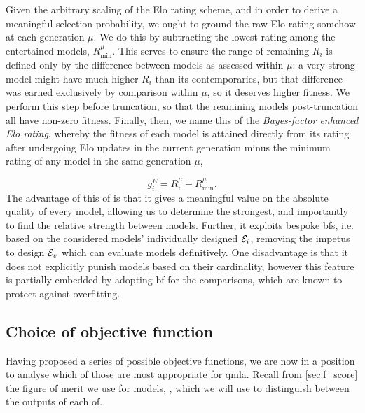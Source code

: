 Given the arbitrary scaling of the Elo rating scheme, 
    and in order to derive a meaningful selection probability, 
    we ought to ground the raw Elo rating somehow at each generation $\mu$. 
We do this by subtracting the lowest rating among the entertained models, $R_{\textrm{min}}^{\mu}$.
This serves to ensure the range of remaining $R_i$ is defined only by the difference between
    models as assessed within $\mu$: 
    a very strong model might have much higher $R_i$ than its contemporaries, 
    but that difference was earned exclusively by comparison within $\mu$, 
    so it deserves higher fitness. 
We perform this step before truncation, so that the reamining models post-truncation
    all have non-zero fitness. 
Finally, then, we name this \gls{of} the \emph{Bayes-factor enhanced Elo rating}, 
    whereby the fitness of each model is attained directly from its rating
    after undergoing Elo updates in the current generation minus the minimum rating of any model 
    in the same generation $\mu$,

\begin{equation}
    \label{eqn:elo_fitness}
    g_i^E = R_i^{\mu} - R_{\textrm{min}}^{\mu}.
\end{equation}
The advantage of this \gls{of} is that it gives a meaningful value on the absolute quality of every model, 
    allowing us to determine the strongest, and importantly to find the relative strength between models. 
Further, it exploits bespoke \glspl{bf}, i.e. based on the considered models' 
    individually designed ${ \mathcal{E} }_i$,
    removing the impetus to design ${ \mathcal{E} }_v$ which can
    evaluate models definitively. 
One disadvantage is that it does not explicitly punish models based 
    on their cardinality, 
    however this feature is partially embedded by adopting \gls{bf} for the comparisons, 
    which are known to protect against overfitting.

\subsection{Choice of objective function}\label{sec:obj_fnc_selection}
Having proposed a series of possible objective functions, 
    we are now in a position to analyse which of those are most appropriate for \gls{qmla}. 
Recall from \cref{sec:f_score} the figure of merit we use for models, \fs, 
    which we will use to distinguish between the outputs of each \gls{of}.
\par 

